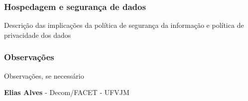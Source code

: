 \documentclass[12pt]{article}
\def\docente{Elias Alves}
\begin{document}
\subsubsection{Hospedagem e segurança de dados}
Descrição das implicações da política de segurança da informação e política de privacidade dos dados

\subsubsection{Observações}
Observações, se necessário

\clearpage
\vfill{}
\begin{center}
\doclicenseThis
\end{center}
\begin{center}
\textbf{\textcopyleft\docente}{ }- Decom/FACET - UFVJM
\end{center}
\end{document}
